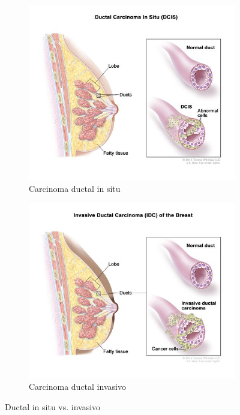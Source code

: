 \documentclass[a4paper,10pt]{book}
\begin{document}
\begin{figure}[h]
    \centering
    \begin{subfigure}[c]{0.48\textwidth}
        \centering
        \includegraphics[width=\textwidth]{reports/assets/dcis.jpg}
        \caption{Carcinoma ductal in situ}
        \label{fig:dcis}
    \end{subfigure}
    \begin{subfigure}[c]{0.48\textwidth}
        \centering
        \includegraphics[width=\textwidth]{reports/assets/idc.jpg}
        \caption{Carcinoma ductal invasivo}
        \label{fig:idc}
    \end{subfigure}
    \caption{Ductal in situ vs. invasivo \cite{noauthor_nci_2011}}
    \label{fig:histological_types_one}
\end{figure}
\end{document}
